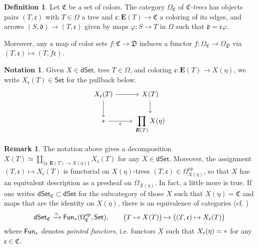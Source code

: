 \documentclass[a4paper,10pt]{article}%
\numberwithin{equation}{section}
\numberwithin{figure}{section}
\theoremstyle{definition} %
\newtheorem{definition}[equation]{Definition}%
\newtheorem{remark}[equation]{Remark}%
\newtheorem{notation}[equation]{Notation}%
\newcommand{\Set}{\mathsf{Set}}
\newcommand{\dSet}{\mathsf{dSet}}
\newcommand{\Fun}{\mathsf{Fun}}
\begin{document}
\begin{definition}\label{CTREE_DEF}
	Let $\mathfrak C$ be a set of colors.
	The category $\Omega_{\mathfrak C}$ of \textit{$\mathfrak C$-trees} has objects pairs $(T, \mathfrak c)$ with 
	$T \in \Omega$ a tree and
	$\mathfrak c \colon \boldsymbol{E}(T) \to \mathfrak C$ a coloring of its edges,
	and arrows
	$(S, \mathfrak d) \to (T, \mathfrak c)$
	given by maps
	$\varphi \colon S \to T$ in $\Omega$ such that $\mathfrak d = \mathfrak c \varphi$.
	
	Moreover, any a map of color sets
	$f \colon \mathfrak C \to \mathfrak D$
	induces a functor
	$f\colon \Omega_{\mathfrak{C}} \to \Omega_{\mathfrak{D}}$
	via
	$(T,\mathfrak{c}) \mapsto (T,f\mathfrak{c})$.
\end{definition}



\begin{notation}\label{MAPSOVCOL NOT}
	Given $X \in \dSet$, tree $T \in \Omega$, 
	and coloring $\mathfrak c \colon \boldsymbol{E}(T) \to X(\eta)$,
	we write $X_{\mathfrak c}(T) \in \Set$ for the pullback below.
	\begin{equation}
	\label{XUDECALT EQ}
	\begin{tikzcd}
	X_{\mathfrak c}(T) \arrow[r] \arrow[d]
	&
	X(T) \arrow[d]
	\\
	\** \arrow{r}[swap]{\mathfrak c}
	&
	\displaystyle{
		\prod\limits_{\boldsymbol{E}(T)} X(\eta)
	}
	\end{tikzcd}
	\end{equation}
\end{notation}




\begin{remark}
	The notation above gives a decomposition
	$X(T) \simeq \coprod_{\{\mathfrak c \colon \boldsymbol{E}(T) \to X(\eta)\}} X_{\mathfrak c}(T)$
	for any $X\in \dSet$.
	Moreover, the assignment
	$(T,\mathfrak c) \mapsto X_{\mathfrak{c}}(T)$ 
	is functorial on
	$X(\eta)$-trees $(T,\mathfrak c) \in \Omega^{op}_{X(\eta)}$,
	so that $X$ has an equivalent description
	as a presheaf on $\Omega_{X(\eta)}$.
	In fact, a little more is true. 
	If one writes 
	$\mathsf{dSet}_{\mathfrak{C}} \subset \dSet$
	for the subcategory of those $X$ such that
	$X(\eta) = \mathfrak{C}$ and maps that are the identity on 
	$X(\eta)$, there is an equivalence of categories ({cf. \cite[Eq. (3.21)]{BP_TAS}})
\begin{equation}\label{DSETCID EQ}
\dSet_{\mathfrak C} \xrightarrow{\simeq}
 \Fun_{\**}(\Omega_{\mathfrak C}^{op}, \Set),
\qquad
\big(T \mapsto X(T)\big) \mapsto \big( (T, \mathfrak c) \mapsto X_{\mathfrak c}(T) \big)
\end{equation}
where $\Fun_{\**}$ denotes \emph{pointed functors},
i.e. functors $X$ such that
$X_{\mathfrak c}(\eta) = \**$
for any $\mathfrak{c} \in \mathfrak{C}$.
\end{remark}
\end{document}
